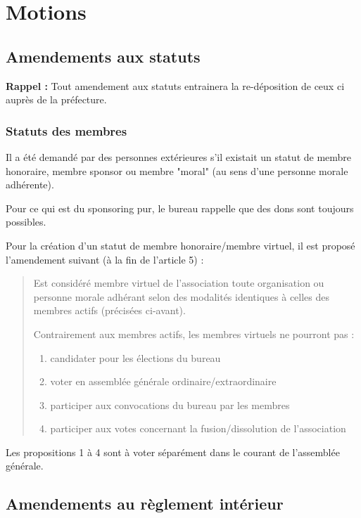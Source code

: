 \documentclass[11pt]{article}
\begin{document}
\section{Motions}

\subsection{Amendements aux statuts}

\textbf{Rappel :} Tout amendement aux statuts entrainera la re-déposition de ceux ci auprès de la préfecture.

\subsubsection{Statuts des membres}

Il a été demandé par des personnes extérieures s'il existait un statut de membre honoraire, membre sponsor ou membre "moral" (au sens d'une personne morale adhérente).

Pour ce qui est du sponsoring pur, le bureau rappelle que des dons sont toujours possibles.

Pour la création d'un statut de membre honoraire/membre virtuel, il est proposé l'amendement suivant (à la fin de l'article 5) :

\begin{quote}
Est considéré membre virtuel de l'association toute organisation ou personne morale adhérant selon des modalités identiques à celles des membres actifs (précisées ci-avant).

Contrairement aux membres actifs, les membres virtuels ne pourront pas :
{\bfseries
\begin{enumerate}
	\item candidater pour les élections du bureau
    \item voter en assemblée générale ordinaire/extraordinaire
    \item participer aux convocations du bureau par les membres
    \item participer aux votes concernant la fusion/dissolution de l'association
\end{enumerate}
}
\end{quote}

Les propositions 1 à 4 sont à voter séparément dans le courant de l'assemblée générale.

\subsection{Amendements au règlement intérieur}
\end{document}
